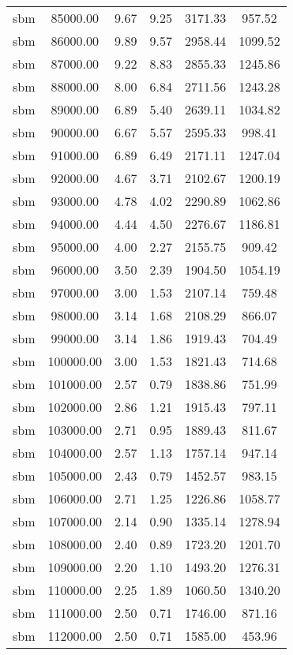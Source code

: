 \begin{table}[ht]
\begin{table}[ht]
\begin{tabular}{|cccccc}
  sbm & 85000.00 & 9.67 & 9.25 & 3171.33 & 957.52 \\ 
  sbm & 86000.00 & 9.89 & 9.57 & 2958.44 & 1099.52 \\ 
  sbm & 87000.00 & 9.22 & 8.83 & 2855.33 & 1245.86 \\ 
  sbm & 88000.00 & 8.00 & 6.84 & 2711.56 & 1243.28 \\ 
  sbm & 89000.00 & 6.89 & 5.40 & 2639.11 & 1034.82 \\ 
  sbm & 90000.00 & 6.67 & 5.57 & 2595.33 & 998.41 \\ 
  sbm & 91000.00 & 6.89 & 6.49 & 2171.11 & 1247.04 \\ 
  sbm & 92000.00 & 4.67 & 3.71 & 2102.67 & 1200.19 \\ 
  sbm & 93000.00 & 4.78 & 4.02 & 2290.89 & 1062.86 \\ 
  sbm & 94000.00 & 4.44 & 4.50 & 2276.67 & 1186.81 \\ 
  sbm & 95000.00 & 4.00 & 2.27 & 2155.75 & 909.42 \\ 
  sbm & 96000.00 & 3.50 & 2.39 & 1904.50 & 1054.19 \\ 
  sbm & 97000.00 & 3.00 & 1.53 & 2107.14 & 759.48 \\ 
  sbm & 98000.00 & 3.14 & 1.68 & 2108.29 & 866.07 \\ 
  sbm & 99000.00 & 3.14 & 1.86 & 1919.43 & 704.49 \\ 
  sbm & 100000.00 & 3.00 & 1.53 & 1821.43 & 714.68 \\ 
  sbm & 101000.00 & 2.57 & 0.79 & 1838.86 & 751.99 \\ 
  sbm & 102000.00 & 2.86 & 1.21 & 1915.43 & 797.11 \\ 
  sbm & 103000.00 & 2.71 & 0.95 & 1889.43 & 811.67 \\ 
  sbm & 104000.00 & 2.57 & 1.13 & 1757.14 & 947.14 \\ 
  sbm & 105000.00 & 2.43 & 0.79 & 1452.57 & 983.15 \\ 
  sbm & 106000.00 & 2.71 & 1.25 & 1226.86 & 1058.77 \\ 
  sbm & 107000.00 & 2.14 & 0.90 & 1335.14 & 1278.94 \\ 
  sbm & 108000.00 & 2.40 & 0.89 & 1723.20 & 1201.70 \\ 
  sbm & 109000.00 & 2.20 & 1.10 & 1493.20 & 1276.31 \\ 
  sbm & 110000.00 & 2.25 & 1.89 & 1060.50 & 1340.20 \\ 
  sbm & 111000.00 & 2.50 & 0.71 & 1746.00 & 871.16 \\ 
  sbm & 112000.00 & 2.50 & 0.71 & 1585.00 & 453.96 \\ 

\end{tabular}
\end{table}
\end{table}
